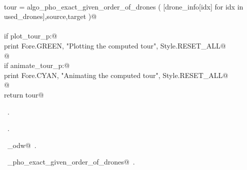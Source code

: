 \documentclass[12.0pt]{report}
\begin{document}
\begin{flushleft}
\begin{list}{}{}
\mbox{}\verb@@\\
\mbox{}\verb@    tour = algo_pho_exact_given_order_of_drones ( [drone_info[idx] for idx in used_drones],source,target )@\\
\mbox{}\verb@@\\
\mbox{}\verb@    if plot_tour_p:@\\
\mbox{}\verb@         print Fore.GREEN, "Plotting the computed tour", Style.RESET_ALL@\\
\mbox{}\verb@    @\\
\mbox{}\verb@    if animate_tour_p:@\\
\mbox{}\verb@         print Fore.CYAN, "Animating the computed tour", Style.RESET_ALL@\\
\mbox{}\verb@    @\\
\mbox{}\verb@    return tour@\\
\mbox{}\verb@@{\NWsep}
\end{list}
\vspace{-1.5ex}
\footnotesize
\begin{list}{}{\setlength{\itemsep}{-\parsep}\setlength{\itemindent}{-\leftmargin}}
\item \NWtxtMacroDefBy\ .
\item \NWtxtMacroRefIn\ .
\item \NWtxtIdentsDefed\nobreak\  \verb@algo_odw@\nobreak\ .\item \NWtxtIdentsUsed\nobreak\  \verb@algo_pho_exact_given_order_of_drones@\nobreak\ .
\item{}
\end{list}
\vspace{4ex}
\end{flushleft}
\end{document}
